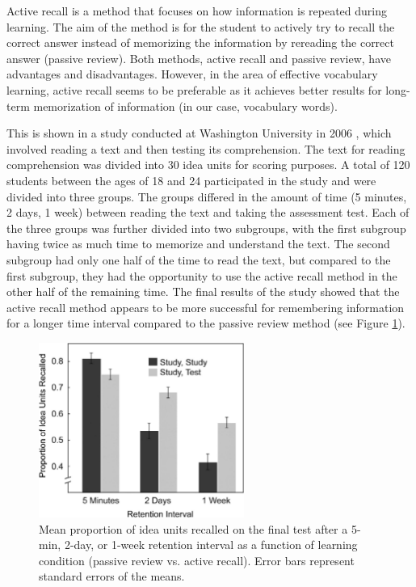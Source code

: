 Active recall is a method that focuses on how information is repeated during learning. The aim of the method is for the student to actively try to recall the correct answer instead of memorizing the information by rereading the correct answer (passive review). Both methods, active recall and passive review, have advantages and disadvantages. However, in the area of effective vocabulary learning, active recall seems to be preferable as it achieves better results for long-term memorization of information (in our case, vocabulary words).

This is shown in a study conducted at Washington University in 2006 \cite{cite:rhkj2006_longterm_retention}, which involved reading a text and then testing its comprehension. The text for reading comprehension was divided into 30 idea units for scoring purposes. A total of 120 students between the ages of 18 and 24 participated in the study and were divided into three groups. The groups differed in the amount of time (5 minutes, 2 days, 1 week) between reading the text and taking the assessment test. Each of the three groups was further divided into two subgroups, with the first subgroup having twice as much time to memorize and understand the text. The second subgroup had only one half of the time to read the text, but compared to the first subgroup, they had the opportunity to use the active recall method in the other half of the remaining time. The final results of the study showed that the active recall method appears to be more successful for remembering information for a longer time interval compared to the passive review method (see Figure \ref{fig:active-recall-passive-review-results}).

\begin{figure}[!h]
    \includegraphics[width=0.6\textwidth]{chapters/images/active-recall-passive-review-results.jpeg}
    \caption{Mean proportion of idea units recalled on the final test after a 5-min, 2-day, or 1-week retention interval as a function of learning condition (passive review vs. active recall). Error bars represent standard errors of the means. \cite{cite:rhkj2006_longterm_retention}}
    \label{fig:active-recall-passive-review-results}
\end{figure}

